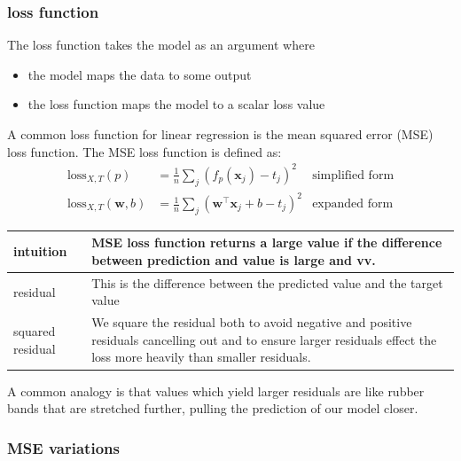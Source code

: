 \documentclass[12pt]{article}
\begin{document}
\subsubsection*{loss function}

The loss function takes the model as an argument where
\begin{itemize}[leftmargin=*, noitemsep]
    \item the model maps the data to some output
    \item the loss function maps the model to a scalar loss value
\end{itemize}

A common loss function for linear regression is the mean squared error (MSE) loss function. The MSE loss function is defined as:
\begin{align*}
    \text{loss}_{X, T}(p) & = \frac{1}{n}\sum_{j}{(f_p(\mathbf{x}_j) - t_j)}^2 & \text{simplified form} \\
    \text{loss}_{X, T}(\mathbf{w}, b) & = \frac{1}{n}\sum_{j}{(\mathbf{w}^\intercal \mathbf{x}_j + b - t_j)}^2 & \text{expanded form}
\end{align*}

\begin{center}
    \begin{tabular}{|M{3cm}|M{0.80\textwidth}|}
        \hline
        intuition & MSE loss function returns a large value if the difference between prediction and value is large and vv. \\
        \hline
        residual & This is the difference between the predicted value and the target value \\
        \hline
        squared residual & We square the residual both to avoid negative and positive residuals cancelling out and to ensure larger residuals effect the loss more heavily than smaller residuals. \\
        \hline
    \end{tabular}
\end{center}

A common analogy is that values which yield larger residuals are like rubber bands that are stretched further, pulling the prediction of our model closer.\\

\subsubsection*{MSE variations}
\end{document}
